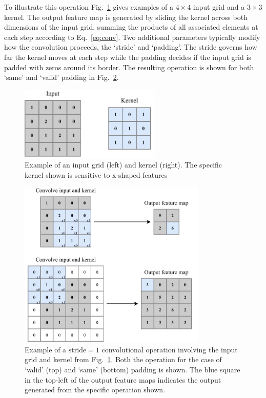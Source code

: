 To illustrate this operation Fig.~\ref{fig:conv_input} gives examples of a $4 \times 4$ input grid
and a $3 \times 3$ kernel. The output feature map is generated by sliding the kernel across both
dimensions of the input grid, summing the products of all associated elements at each step
according to Eq.~\ref{eq:conv}. Two additional parameters typically modify how the convolution
proceeds, the `stride' and `padding'. The stride governs how far the kernel moves at each step
while the padding decides if the input grid is padded with zeros around its border. The resulting
operation is shown for both `same' and `valid' padding in Fig.~\ref{fig:conv_operation}.

\begin{figure} %
    \includegraphics[width=0.6\textwidth]{diagrams/7-cvn/conv_input.pdf}
    \caption[Example of an input grid and kernel.]
    {Example of an input grid (left) and kernel (right). The specific kernel shown is sensitive to
        x-shaped features}
    \label{fig:conv_input}
\end{figure}

\begin{figure} %
    \includegraphics[width=0.8\textwidth]{diagrams/7-cvn/conv_operation.pdf}
    \caption[Example of convolutional operation.]
    {Example of a $\mathrm{stride}=1$ convolutional operation involving the input grid and kernel from
        Fig.~\ref{fig:conv_input}. Both the operation for the case of `valid' (top) and `same' (bottom)
        padding is shown. The blue square in the top-left of the output feature maps indicates the
        output generated from the specific operation shown.}
    \label{fig:conv_operation}
\end{figure}

